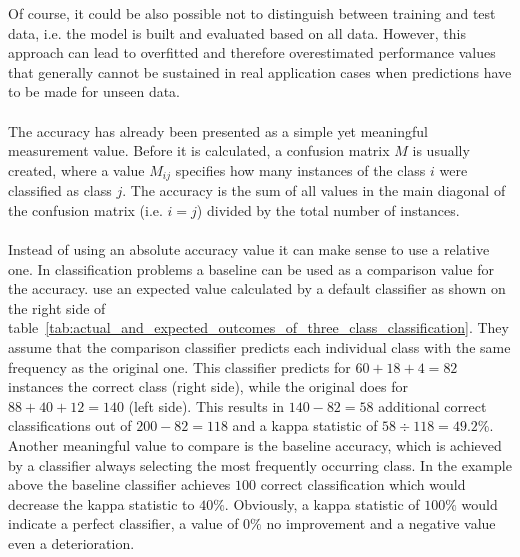 \documentclass[article,type=msc,colorback,accentcolor=tud7b]{tudthesis}
\begin{document}
    Of course, it could be also possible not to distinguish between training and test data, i.e. the model is built and evaluated based on all data. However, this approach can lead to overfitted and therefore overestimated performance values that generally cannot be sustained in real application cases when predictions have to be made for unseen data. \\\\
    The accuracy has already been presented as a simple yet meaningful measurement value. Before it is calculated, a confusion matrix $M$ is usually created, where a value $M_{ij}$ specifies how many instances of the class $i$ were classified as class $j$. The accuracy is the sum of all values in the main diagonal of the confusion matrix (i.e. $i=j$) divided by the total number of instances. \\\\
Instead of using an absolute accuracy value it can make sense to use a relative one. In classification problems a baseline can be used as a comparison value for the accuracy. \citeauthor{Witten2005} use an expected value calculated by a default classifier as shown on the right side of table~\ref{tab:actual_and_expected_outcomes_of_three_class_classification}. They assume that the comparison classifier predicts each individual class with the same frequency as the original one. This classifier predicts for $60+18+4=82$ instances the correct class (right side), while the original does for $88+40+12=140$ (left side). This results in $140-82=58$ additional correct classifications out of $200-82=118$ and a kappa statistic of $58\div118=49.2\%$. Another meaningful value to compare is the baseline accuracy, which is achieved by a classifier always selecting the most frequently occurring class. In the example above the baseline classifier achieves $100$ correct classification which would decrease the kappa statistic to $40\%$. Obviously, a kappa statistic of $100\%$ would indicate a perfect classifier, a value of $0\%$ no improvement and a negative value even a deterioration.
  
\end{document}
